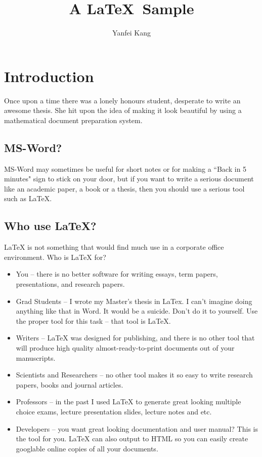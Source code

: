 \documentclass[a4paper,11pt]{article}
\begin{document}
  
\title{A \LaTeX~Sample}
\author{Yanfei Kang}

\maketitle


\section{Introduction}

Once upon a time there was a lonely honours student, desperate to write
an awesome thesis. She hit upon the idea of making it look beautiful by using a mathematical document preparation system.

\subsection{MS-Word?}
MS-Word may sometimes be useful for short notes or for making a ``Back in 5 minutes" sign to stick on your door, but if you want to write a serious document like an academic paper, a book or a thesis, then you should use a serious tool such as \LaTeX.

\subsection{Who use \LaTeX ?}
LaTeX is not something that would find much use in a corporate office environment. Who is LaTeX for?

\begin{itemize}

\item You -- there is no better software for writing essays, term papers, presentations, and research papers.
\item Grad Students -- I wrote my Master’s thesis in LaTex. I can’t imagine doing anything like that in Word. It would be a suicide. Don’t do it to yourself. Use the proper tool for this task – that tool is LaTeX.
\item Writers -- LaTeX was designed for publishing, and there is no other tool that will produce high quality almost-ready-to-print documents out of your manuscripts.
\item Scientists and Researchers -- no other tool makes it so easy to write research papers, books and journal articles.
\item Professors -- in the past I used LaTeX to generate great looking multiple choice exams, lecture presentation slides, lecture notes and etc.
\item Developers -- you want great looking documentation and user manual? This is the tool for you. LaTeX can also output to HTML so you can easily create googlable online copies of all your documents.
\end{itemize}
\end{document}
